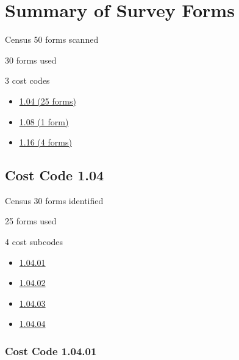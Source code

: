 % 


\section{Summary of Survey Forms}
\begin{frame}{Census}
  50 forms scanned\par
  30 forms used\par
  3 cost codes\par
  \begin{itemize}
    \item \hyperlink{sec:1.04}{1.04 (25 forms)}
    \item \hyperlink{sec:1.08}{1.08 (1 form)}
    \item \hyperlink{sec:1.16}{1.16 (4 forms)}
  \end{itemize}
\end{frame}

\subsection{Cost Code 1.04}\hypertarget{sec:1.04}{}
\begin{frame}{Census}
  30 forms identified\par
  25 forms used\par
  4 cost subcodes\par
  \begin{itemize}
    \item \hyperlink{sec:1.04.01}{1.04.01}
    \item \hyperlink{sec:1.04.02}{1.04.02}
    \item \hyperlink{sec:1.04.03}{1.04.03}
    \item \hyperlink{sec:1.04.04}{1.04.04}
  \end{itemize}
\end{frame}

\subsubsection{Cost Code 1.04.01}\hypertarget{sec:1.04.01}{}
	
	
	


